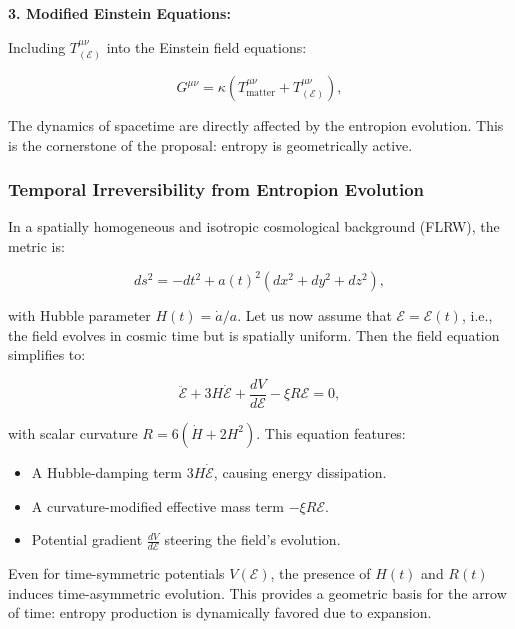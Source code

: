 \documentclass[12pt]{article}
\begin{document}
\vspace{0.2cm}
\noindent
\textbf{3. Modified Einstein Equations:}

Including \( T^{\mu\nu}_{(\mathcal{E})} \) into the Einstein field equations:

\begin{equation}
G^{\mu\nu} = \kappa \left( T^{\mu\nu}_{\text{matter}} + T^{\mu\nu}_{(\mathcal{E})} \right),
\end{equation}

The dynamics of spacetime are directly affected by the entropion evolution. This is the cornerstone of the proposal: entropy is geometrically active.

\subsubsection*{Temporal Irreversibility from Entropion Evolution}

In a spatially homogeneous and isotropic cosmological background (FLRW), the metric is:

\begin{equation}
ds^2 = -dt^2 + a(t)^2 \left( dx^2 + dy^2 + dz^2 \right),
\end{equation}

with Hubble parameter \( H(t) = \dot{a}/a \). Let us now assume that \( \mathcal{E} = \mathcal{E}(t) \), i.e., the field evolves in cosmic time but is spatially uniform. Then the field equation simplifies to:

\begin{equation}
\ddot{\mathcal{E}} + 3 H \dot{\mathcal{E}} + \frac{dV}{d\mathcal{E}} - \xi R \mathcal{E} = 0,
\end{equation}

with scalar curvature \( R = 6(\dot{H} + 2H^2) \). This equation features:

\begin{itemize}
    \item A Hubble-damping term \( 3H \dot{\mathcal{E}} \), causing energy dissipation.
    \item A curvature-modified effective mass term \( -\xi R \mathcal{E} \).
    \item Potential gradient \( \frac{dV}{d\mathcal{E}} \) steering the field's evolution.
\end{itemize}

Even for time-symmetric potentials \( V(\mathcal{E}) \), the presence of \( H(t) \) and \( R(t) \) induces time-asymmetric evolution. This provides a geometric basis for the arrow of time: entropy production is dynamically favored due to expansion.
\end{document}
